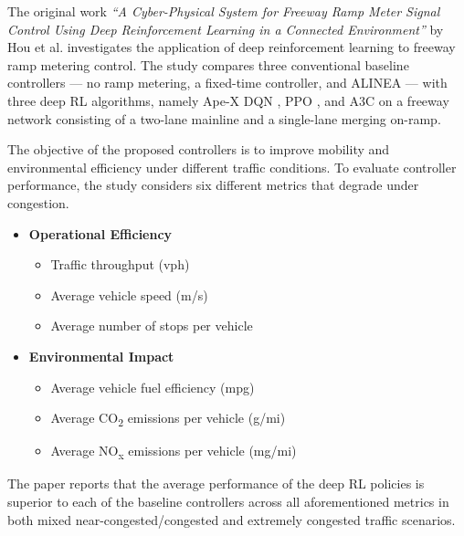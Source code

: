 The original work \textit{“A Cyber-Physical System for Freeway Ramp Meter Signal Control Using Deep Reinforcement Learning in a Connected Environment”} 
by Hou et al. \cite{hou2021rampmeter} investigates the application of deep reinforcement learning to freeway ramp metering control. The study compares 
three conventional baseline controllers — no ramp metering, a fixed-time controller, and ALINEA — with three deep RL algorithms, namely Ape-X DQN \cite{horgan2018distributed}, PPO \cite{schulman2017ppo}, 
and A3C \cite{mnih2016a3c} on a freeway network consisting of a two-lane mainline and a single-lane merging on-ramp.

The objective of the proposed controllers is to improve mobility and environmental efficiency under different traffic conditions. 
To evaluate controller performance, the study considers six different metrics that degrade under congestion.

\medskip
\begin{itemize}[label=\textbullet, nosep, leftmargin=1.5em]
    \item \textbf{Operational Efficiency}
    \begin{itemize}[label=$\circ$, nosep]
        \item Traffic throughput (vph)
        \item Average vehicle speed (m/s)
        \item Average number of stops per vehicle
    \end{itemize}
    \item \textbf{Environmental Impact}
    \begin{itemize}[label=$\circ$, nosep]
        \item Average vehicle fuel efficiency (mpg)
        \item Average CO\textsubscript{2} emissions per vehicle (g/mi)
        \item Average NO\textsubscript{x} emissions per vehicle (mg/mi)
    \end{itemize}
\end{itemize}
\medskip

The paper reports that the average performance of the deep RL policies is superior
to each of the baseline controllers across all aforementioned metrics 
in both mixed near-congested/congested and extremely congested traffic scenarios. 


